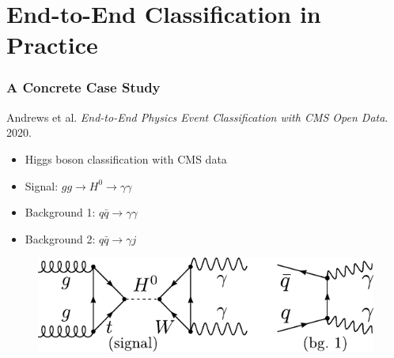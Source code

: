 \documentclass[14pt, t]{beamer}
\begin{document}
\section{End-to-End Classification in Practice}
\begin{frame}
    \frametitle{A Concrete Case Study}

    Andrews et al. \textit{End-to-End Physics Event Classification with CMS Open Data}. 2020. \cite{andrews-higgs}

    \begin{itemize}
    
        \item Higgs boson classification with CMS data

        \item Signal: $ gg \to H^{0} \to \gamma \gamma $

        \item Background 1: $ q \bar{q} \to \gamma \gamma $

        \item Background 2: $ q \bar{q} \to \gamma j $
    
    \end{itemize}

    \begin{figure}[htb!]
        \centering
        \includegraphics[width=\linewidth]{vector/figures-presentation/feynman.pdf}
    \end{figure}
    
\end{frame}
\end{document}
